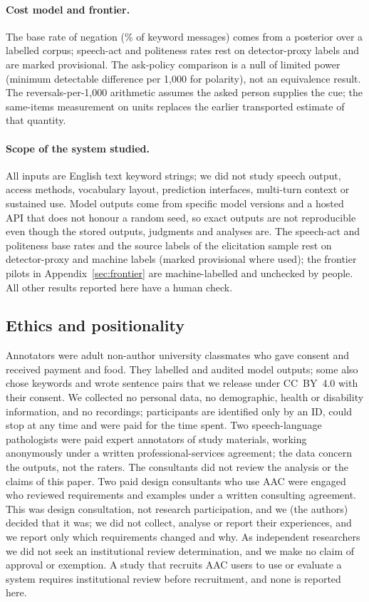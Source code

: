 \paragraph{Cost model and frontier.}
The base rate of negation (\jmtTwoNegBase{}\% of keyword messages) comes from a posterior over a labelled corpus; speech-act and politeness rates rest on detector-proxy labels and are marked provisional.
The ask-policy comparison is a null of limited power (minimum detectable difference \jmdpMdePol{} per 1,000 for polarity), not an equivalence result.
The reversals-per-1,000 arithmetic assumes the asked person supplies the cue; the same-items measurement on \jmfOneUnits{} units replaces the earlier transported estimate of that quantity.

\paragraph{Scope of the system studied.}
All inputs are English text keyword strings; we did not study speech output, access methods, vocabulary layout, prediction interfaces, multi-turn context or sustained use.
Model outputs come from specific model versions and a hosted API that does not honour a random seed, so exact outputs are not reproducible even though the stored outputs, judgments and analyses are.
The speech-act and politeness base rates and the source labels of the elicitation sample rest on detector-proxy and machine labels (marked provisional where used); the frontier pilots in Appendix~\ref{sec:frontier} are machine-labelled and unchecked by people. All other results reported here have a human check.

\subsection{Ethics and positionality}\label{sec:ethics-positionality}

Annotators were adult non-author university classmates who gave consent and received payment and food.
They labelled and audited model outputs; some also chose keywords and wrote sentence pairs that we release under CC~BY~4.0 with their consent.
We collected no personal data, no demographic, health or disability information, and no recordings; participants are identified only by an ID, could stop at any time and were paid for the time spent.
Two speech-language pathologists were paid expert annotators of study materials, working anonymously under a written professional-services agreement; the data concern the outputs, not the raters.
The consultants did not review the analysis or the claims of this paper. Two paid design consultants who use AAC were engaged who reviewed requirements and examples under a written consulting agreement. This was design consultation, not research participation, and we (the authors) decided that it was; we did not collect, analyse or report their experiences, and we report only which requirements changed and why.
As independent researchers we did not seek an institutional review determination, and we make no claim of approval or exemption.
A study that recruits AAC users to use or evaluate a system requires institutional review before recruitment, and none is reported here.


